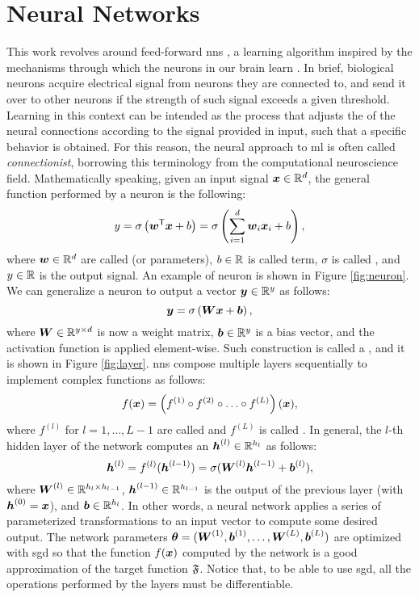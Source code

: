\section{Neural Networks}\label{sec:nn}
This work revolves around feed-forward \glspl{nn} \citep{haykin2009nnets,goodfellow2016dl}, a learning algorithm inspired by the mechanisms through which the neurons in our brain learn \citep{rosenblatt1958perceptron}. In brief, biological neurons acquire electrical signal from neurons they are connected to, and send it over to other neurons if the strength of such signal exceeds a given threshold. Learning in this context can be intended as the process that adjusts the  of the neural connections according to the signal provided in input, such that a specific behavior is obtained. For this reason, the neural approach to \gls{ml} is often called \emph{connectionist}, borrowing this terminology from the computational neuroscience field. Mathematically speaking, given an input signal $\Vector{x} \in \Real^d$, the general function performed by a neuron is the following:
$$y = \sigma\Par{\Vector{w}^{\Transpose} \Vector{x} + b} = \sigma\Par{\sum_{i=1}^d \Feature{w}{i} \Feature{x}{i} + b},$$
where $\Vector{w} \in \Real^d$ are called  (or parameters), $b \in \mathbb{R}$ is called  term, $\sigma$ is called , and $y \in \mathbb{R}$ is the output signal. An example of neuron is shown in Figure \ref{fig:neuron}. We can generalize a neuron to output a vector $\Vector{y} \in \Real^y$ as follows:
$$\Vector{y} = \sigma\Par{\Matrix{W} \Vector{x} + \Vector{b}},$$
where $\Matrix{W} \in \Real^{y \times d}$ is now a weight matrix,  $\Vector{b} \in \Real^y$ is a bias vector, and the activation function is applied element-wise. Such construction is called a , and it is shown in Figure \ref{fig:layer}. \glspl{nn} compose multiple layers sequentially to implement complex functions as follows:
$$f(\Vector{x}) = \Par{f^{(1)} \circ f^{(2)} \circ \ldots \circ f^{(L)}}(\Vector{x}),$$
where $f^{(l)}$ for $l = 1, \ldots, L-1$ are called  and $f^{(L)}$ is called . In general, the $l$-th hidden layer of the network computes an  $\LayerVector{h}{l} \in \Real^{h_l}$ as follows:
$$ \LayerVector{h}{l} = f^{(l)}(\LayerVector{h}{l-1}) = \sigma(\LayerMatrix{W}{l} \LayerVector{h}{l-1} + \LayerVector{b}{l}),$$
where $\LayerMatrix{W}{l} \in \Real^{h_{l} \times h_{l-1}}$, $\LayerVector{h}{l-1} \in \Real^{h_{l-1}}$ is the output of the previous layer (with $\LayerVector{h}{0} = \Vector{x}$), and $\Vector{b} \in \Real^{h_l}$. In other words, a neural network applies a series of parameterized transformations to an input vector to compute some desired output. The network parameters $\Param = (\LayerMatrix{W}{1}, \LayerVector{b}{1}, \ldots, \LayerMatrix{W}{L}, \LayerVector{b}{L})$ are optimized with \gls{sgd} so that the  function $f(\Vector{x})$ computed by the network is a good approximation of the target function $\mathfrak{F}$. Notice that, to be able to use \gls{sgd}, all the operations performed by the layers must be differentiable.
